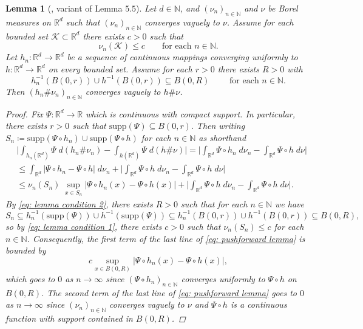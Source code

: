 \documentclass{article}
\newtheorem{lemma}[define]{Lemma}
\newcommand{\R}{\mathbb{R}}
\newcommand{\N}{\mathbb{N}}
\begin{document}
\begin{lemma}[\cite{dymond2018mapping}, variant of Lemma $5.5$] \label{lemma: pushforward measures vaguely converging} Let $d \in \N$, and $(\nu_n)_{n \in \N}$ and $\nu$ be Borel measures on $\R^d$ such that $(\nu_n)_{n \in \N}$ converges vaguely to $\nu$. Assume for each bounded set $\mathcal{K} \subset \R^d$ there exists $c>0$ such that 
\begin{equation} \label{eq: lemma condition 1}
    \nu_n(\mathcal{K}) \leq c \qquad \text{for each $n \in \N$}.
\end{equation}
Let $h_n:\R^d \to \R^d$ be a sequence of continuous mappings converging uniformly to $h:\R^d\to \R^d$ on every bounded set. Assume for each $r>0$ there exists $R>0$ with
\begin{equation} \label{eq: lemma condition 2}
    h_n^{-1}(B(0,r))\cup h^{-1}(B(0,r)) \subseteq B(0,R) \qquad \text{ for each $n \in \N$}.
\end{equation}Then $(h_n \# \nu_n)_{{n\in\N}}$ converges vaguely to $h \# \nu$.
    \begin{proof}
        Fix $\Psi:\R^d\to \R$ which is continuous with compact support. In particular, there exists $r >0$ such that $\text{supp}(\Psi)\subseteq B(0,r).$ Then writing $S_n \coloneqq \text{supp}(\Psi \circ h_n) \cup \text{supp}(\Psi \circ h)$ for each $n \in \N$ as shorthand
        \begin{equation} \label{eq: pushforward lemma}
            \begin{split}
        &\bigg|\int_{h_n(\R^d)}\Psi \; d(h_n \# \nu_n) - \int_{h(\R^d)}\Psi \; d(h \# \nu)\bigg| = \bigg|\int_{\R^d}\Psi\circ h_n \; d\nu_n - \int_{\R^d}\Psi \circ h\; d\nu\bigg| 
        \\&\leq\int_{\R^d}|\Psi\circ h_n - \Psi \circ h|\; d\nu_n+\bigg|\int_{\R^d}\Psi\circ h \; d\nu_n - \int_{\R^d}\Psi \circ h\; d\nu\bigg|\\
        &\leq \nu_n(S_n)\;\sup_{x \in S_n}|\Psi\circ h_n(x) - \Psi \circ h(x)|+ \bigg|\int_{\R^d}\Psi\circ h \; d\nu_n - \int_{\R^d}\Psi \circ h\; d\nu\bigg|.
            \end{split}
        \end{equation} By \eqref{eq: lemma condition 2}, there exists $R>0$ such that for each $n \in \N$ we have
        $$S_n\subseteq h_n^{-1}(\text{supp}(\Psi)) \cup h^{-1}(\text{supp}(\Psi)) \subseteq h_n^{-1}(B(0,r)) \cup h^{-1}(B(0,r))\subseteq B(0,R),$$
        so by \eqref{eq: lemma condition 1}, there exists $c>0$ such that $\nu_n(S_n) \leq c$ for each $n \in \N$. 
        Consequently, the first term of the last line of \eqref{eq: pushforward lemma} is bounded by $$c\sup_{x \in B(0,R)} |\Psi \circ h_n(x) - \Psi \circ h(x)|,$$ which goes to $0$ as $n \to \infty$ since $(\Psi \circ h_n)_{n \in \N}$ converges uniformly to $\Psi \circ h$ on $B(0,R)$. The second term of the last line of \eqref{eq: pushforward lemma} goes to $0$ as $n \to \infty$ since $(\nu_n)_{n \in \N}$ converges vaguely to $\nu$ and $\Psi \circ h$ is a continuous function with support contained in $B(0,R)$. 
    \end{proof}
\end{lemma}
\end{document}
